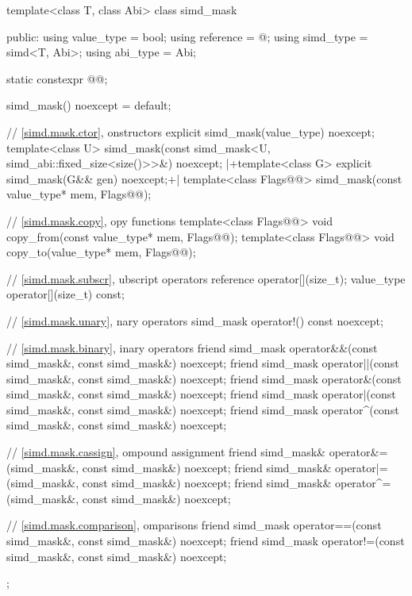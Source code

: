 \begin{codeblock}
template<class T, class Abi> class simd_mask {
public:
  using value_type = bool;
  using reference = @\seebelow@;
  using simd_type = simd<T, Abi>;
  using abi_type = Abi;

  static constexpr @@;

  simd_mask() noexcept = default;

  // \ref{simd.mask.ctor}, onstructors
  explicit simd_mask(value_type) noexcept;
  template<class U>
    simd_mask(const simd_mask<U, simd_abi::fixed_size<size()>>&) noexcept;
  |+template<class G> explicit simd_mask(G&& gen) noexcept;+|
  template<class Flags@@> simd_mask(const value_type* mem, Flags@\wgAdd{ = \{\}}@);

  // \ref{simd.mask.copy}, opy functions
  template<class Flags@@> void copy_from(const value_type* mem, Flags@\wgAdd{ = \{\}}@);
  template<class Flags@@> void copy_to(value_type* mem, Flags@\wgAdd{ = \{\}}@);

  // \ref{simd.mask.subscr}, ubscript operators
  reference operator[](size_t);
  value_type operator[](size_t) const;

  // \ref{simd.mask.unary}, nary operators
  simd_mask operator!() const noexcept;

  // \ref{simd.mask.binary}, inary operators
  friend simd_mask operator&&(const simd_mask&, const simd_mask&) noexcept;
  friend simd_mask operator||(const simd_mask&, const simd_mask&) noexcept;
  friend simd_mask operator&(const simd_mask&, const simd_mask&) noexcept;
  friend simd_mask operator|(const simd_mask&, const simd_mask&) noexcept;
  friend simd_mask operator^(const simd_mask&, const simd_mask&) noexcept;

  // \ref{simd.mask.cassign}, ompound assignment
  friend simd_mask& operator&=(simd_mask&, const simd_mask&) noexcept;
  friend simd_mask& operator|=(simd_mask&, const simd_mask&) noexcept;
  friend simd_mask& operator^=(simd_mask&, const simd_mask&) noexcept;

  // \ref{simd.mask.comparison}, omparisons
  friend simd_mask operator==(const simd_mask&, const simd_mask&) noexcept;
  friend simd_mask operator!=(const simd_mask&, const simd_mask&) noexcept;
};
\end{codeblock}

